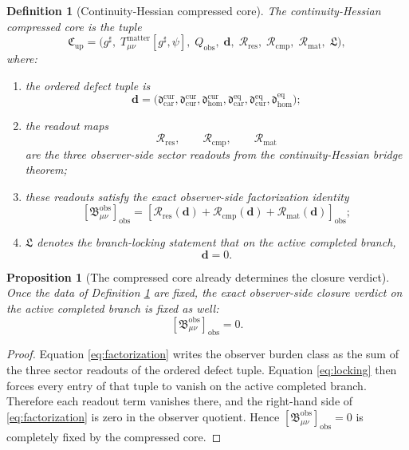 \documentclass[11pt]{article}
\newcommand{\CompletedMetric}{g^{\sharp}}
\newcommand{\ObsBurden}{\mathfrak B_{\mu\nu}^{\mathrm{obs}}}
\newcommand{\ObserverClass}[1]{\left[#1\right]_{\mathrm{obs}}}
\newcommand{\DefectTuple}{\mathbf d}
\newcommand{\CompressionData}{\mathfrak C_{\mathrm{up}}}
\newcommand{\ObserverQuotient}{Q_{\mathrm{obs}}}
\newcommand{\ResidualRead}{\mathscr R_{\mathrm{res}}}
\newcommand{\CompletionRead}{\mathscr R_{\mathrm{cmp}}}
\newcommand{\MatterRead}{\mathscr R_{\mathrm{mat}}}
\newcommand{\BranchLock}{\mathfrak L}
\newtheorem{definition}{Definition}
\newtheorem{proposition}{Proposition}
\begin{document}
\begin{definition}[Continuity-Hessian compressed core]
\label{def:core}
The \emph{continuity-Hessian compressed core} is the tuple
\[
\CompressionData
=
\bigl(
\CompletedMetric,\;
T_{\mu\nu}^{\mathrm{matter}}[\CompletedMetric,\psi],\;
\ObserverQuotient,\;
\DefectTuple,\;
\ResidualRead,\;
\CompletionRead,\;
\MatterRead,\;
\BranchLock
\bigr),
\]
where:
\begin{enumerate}
    \item the ordered defect tuple is
    \[
    \DefectTuple
    =
    \bigl(
    \mathfrak d_{\mathrm{car}}^{\mathrm{cur}},
    \mathfrak d_{\mathrm{cur}}^{\mathrm{cur}},
    \mathfrak d_{\mathrm{hom}}^{\mathrm{cur}},
    \mathfrak d_{\mathrm{car}}^{\mathrm{eq}},
    \mathfrak d_{\mathrm{cur}}^{\mathrm{eq}},
    \mathfrak d_{\mathrm{hom}}^{\mathrm{eq}}
    \bigr);
    \]
    \item the readout maps
    \[
    \ResidualRead,\qquad
    \CompletionRead,\qquad
    \MatterRead
    \]
    are the three observer-side sector readouts from the continuity-Hessian bridge theorem;
    \item these readouts satisfy the exact observer-side factorization identity
    \begin{equation}
    \ObserverClass{\ObsBurden}
    =
    \ObserverClass{
    \ResidualRead(\DefectTuple)
    +\CompletionRead(\DefectTuple)
    +\MatterRead(\DefectTuple)};
    \label{eq:factorization}
    \end{equation}
    \item \(\BranchLock\) denotes the branch-locking statement that on the active completed branch,
    \begin{equation}
    \DefectTuple=0.
    \label{eq:locking}
    \end{equation}
\end{enumerate}
\end{definition}

\begin{proposition}[The compressed core already determines the closure verdict]
\label{prop:core_closure}
Once the data of Definition \ref{def:core} are fixed, the exact observer-side closure verdict on the active completed branch is fixed as well:
\[
\ObserverClass{\ObsBurden}=0.
\]
\end{proposition}

\begin{proof}
Equation \eqref{eq:factorization} writes the observer burden class as the sum of the three sector readouts of the ordered defect tuple. Equation \eqref{eq:locking} then forces every entry of that tuple to vanish on the active completed branch. Therefore each readout term vanishes there, and the right-hand side of \eqref{eq:factorization} is zero in the observer quotient. Hence \(\ObserverClass{\ObsBurden}=0\) is completely fixed by the compressed core.
\end{proof}
\end{document}
